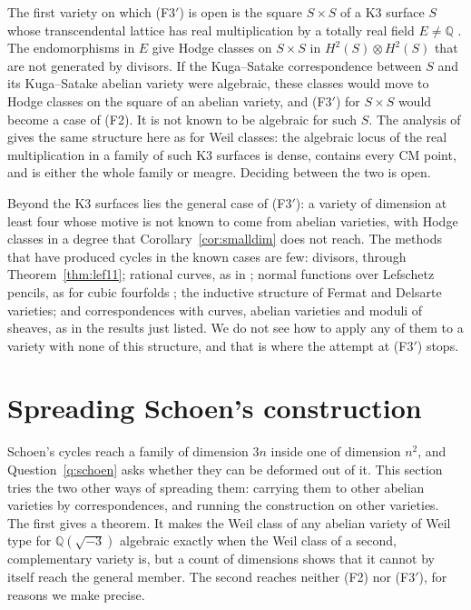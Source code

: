 \documentclass[11pt]{amsart}
\theoremstyle{definition}
\theoremstyle{remark}
\newcommand{\QQ}{\mathbb{Q}}
\begin{document}
The first variety on which (F3$'$) is open is the square $S\times S$ of a K3
surface $S$ whose transcendental lattice has real multiplication by a totally
real field $E\ne\QQ$ \cite{BhH8}. The endomorphisms in $E$ give Hodge classes
on $S\times S$ in $H^{2}(S)\otimes H^{2}(S)$ that are not generated by divisors.
If the Kuga--Satake correspondence between $S$ and its Kuga--Satake abelian
variety were algebraic, these classes would move to Hodge classes on the
square of an abelian variety, and (F3$'$) for $S\times S$ would become a case
of (F2). It is not known to be algebraic for such $S$. The analysis of
\cite{BhH8} gives the same structure here as for Weil classes: the algebraic
locus of the real multiplication in a family of such K3 surfaces is dense,
contains every CM point, and is either the whole family or meagre. Deciding
between the two is open.

Beyond the K3 surfaces lies the general case of (F3$'$): a variety of
dimension at least four whose motive is not known to come from abelian
varieties, with Hodge classes in a degree that Corollary~\ref{cor:smalldim}
does not reach. The methods that have produced cycles in the known cases are
few: divisors, through Theorem~\ref{thm:lef11}; rational curves, as in
\cite{CM78}; normal functions over Lefschetz pencils, as for cubic fourfolds
\cite{Zuc77}; the inductive structure of Fermat and Delsarte varieties; and
correspondences with curves, abelian varieties and moduli of sheaves, as in
the results just listed. We do not see how to apply any of them to a
variety with none of this structure, and that is where the attempt at (F3$'$)
stops.

\section{Spreading Schoen's construction}\label{sec:spread}

Schoen's cycles reach a family of dimension $3n$ inside one of dimension
$n^{2}$, and Question~\ref{q:schoen} asks whether they can be deformed out of
it. This section tries the two other ways of spreading them: carrying them to
other abelian varieties by correspondences, and running the construction on
other varieties. The first gives a theorem. It makes the Weil class of any
abelian variety of Weil type for $\QQ(\sqrt{-3})$ algebraic exactly when the
Weil class of a second, complementary variety is, but a count of dimensions
shows that it cannot by itself reach the general member. The second reaches
neither (F2) nor (F3$'$), for reasons we make precise.
\end{document}
